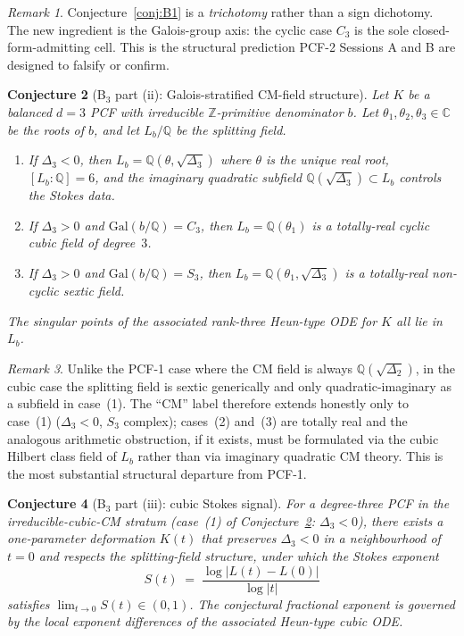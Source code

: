 \documentclass[11pt,a4paper]{article}
\newtheorem{conjecture}{Conjecture}
\theoremstyle{definition}
\theoremstyle{remark}
\newtheorem{remark}[conjecture]{Remark}
\newcommand{\Q}{\mathbb{Q}}
\newcommand{\Z}{\mathbb{Z}}
\newcommand{\C}{\mathbb{C}}
\newcommand{\Gal}{\mathrm{Gal}}
\begin{document}
\begin{remark}\label{rem:trichotomy}
Conjecture~\ref{conj:B1} is a \emph{trichotomy} rather than a sign
dichotomy. The new ingredient is the Galois-group axis: the cyclic case
$C_{3}$ is the sole closed-form-admitting cell. This is the structural
prediction PCF-2 Sessions A and B are designed to falsify or confirm.
\end{remark}

\begin{conjecture}[B$_{3}$ part (ii): Galois-stratified CM-field structure]\label{conj:B2}
Let $K$ be a balanced $d=3$ PCF with irreducible $\Z$-primitive
denominator $b$. Let $\theta_{1},\theta_{2},\theta_{3}\in\C$ be the roots
of $b$, and let $L_{b}/\Q$ be the splitting field.
\begin{enumerate}
\item If $\Delta_{3}<0$, then $L_{b}=\Q(\theta,\sqrt{\Delta_{3}})$ where
$\theta$ is the unique real root, $[L_{b}:\Q]=6$, and the imaginary
quadratic subfield $\Q(\sqrt{\Delta_{3}})\subset L_{b}$ controls the
Stokes data.
\item If $\Delta_{3}>0$ and $\Gal(b/\Q)=C_{3}$, then $L_{b}=\Q(\theta_{1})$
is a totally-real cyclic cubic field of degree~$3$.
\item If $\Delta_{3}>0$ and $\Gal(b/\Q)=S_{3}$, then $L_{b}=\Q(\theta_{1},\sqrt{\Delta_{3}})$
is a totally-real non-cyclic sextic field.
\end{enumerate}
The singular points of the associated rank-three Heun-type ODE for $K$
all lie in $L_{b}$.
\end{conjecture}

\begin{remark}\label{rem:not-binary}
Unlike the PCF-1 case where the CM field is always
$\Q(\sqrt{\Delta_{2}})$, in the cubic case the splitting field is sextic
generically and only quadratic-imaginary as a subfield in case~(1). The
``CM'' label therefore extends honestly only to case~(1)
($\Delta_{3}<0$, $S_{3}$ complex); cases~(2) and~(3) are totally real
and the analogous arithmetic obstruction, if it exists, must be
formulated via the cubic Hilbert class field of $L_{b}$ rather than via
imaginary quadratic CM theory. This is the most substantial structural
departure from PCF-1.
\end{remark}

\begin{conjecture}[B$_{3}$ part (iii): cubic Stokes signal]\label{conj:B3}
For a degree-three PCF in the irreducible-cubic-CM stratum (case~(1) of
Conjecture~\ref{conj:B2}: $\Delta_{3}<0$), there exists a one-parameter
deformation $K(t)$ that preserves $\Delta_{3}<0$ in a neighbourhood of
$t=0$ and respects the splitting-field structure, under which the Stokes
exponent
\[
S(t)\;=\;\frac{\log|L(t)-L(0)|}{\log|t|}
\]
satisfies $\lim_{t\to 0}S(t)\in(0,1)$. The conjectural fractional
exponent is governed by the local exponent differences of the
associated Heun-type cubic ODE.
\end{conjecture}
\end{document}
